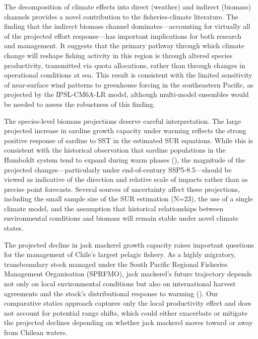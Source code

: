 \documentclass[
  11pt,
]{article}
\begin{document}
The decomposition of climate effects into direct (weather) and indirect (biomass) channels provides a novel contribution to the fisheries-climate literature. The finding that the indirect biomass channel dominates---accounting for virtually all of the projected effort response---has important implications for both research and management. It suggests that the primary pathway through which climate change will reshape fishing activity in this region is through altered species productivity, transmitted via quota allocations, rather than through changes in operational conditions at sea. This result is consistent with the limited sensitivity of near-surface wind patterns to greenhouse forcing in the southeastern Pacific, as projected by the IPSL-CM6A-LR model, although multi-model ensembles would be needed to assess the robustness of this finding.

The species-level biomass projections deserve careful interpretation. The large projected increase in sardine growth capacity under warming reflects the strong positive response of sardine to SST in the estimated SUR equations. While this is consistent with the historical observation that sardine populations in the Humboldt system tend to expand during warm phases (), the magnitude of the projected changes---particularly under end-of-century SSP5-8.5---should be viewed as indicative of the direction and relative scale of impacts rather than as precise point forecasts. Several sources of uncertainty affect these projections, including the small sample size of the SUR estimation (N=23), the use of a single climate model, and the assumption that historical relationships between environmental conditions and biomass will remain stable under novel climate states.

The projected decline in jack mackerel growth capacity raises important questions for the management of Chile's largest pelagic fishery. As a highly migratory, transboundary stock managed under the South Pacific Regional Fisheries Management Organisation (SPRFMO), jack mackerel's future trajectory depends not only on local environmental conditions but also on international harvest agreements and the stock's distributional response to warming (). Our comparative statics approach captures only the local productivity effect and does not account for potential range shifts, which could either exacerbate or mitigate the projected declines depending on whether jack mackerel moves toward or away from Chilean waters.
\end{document}
